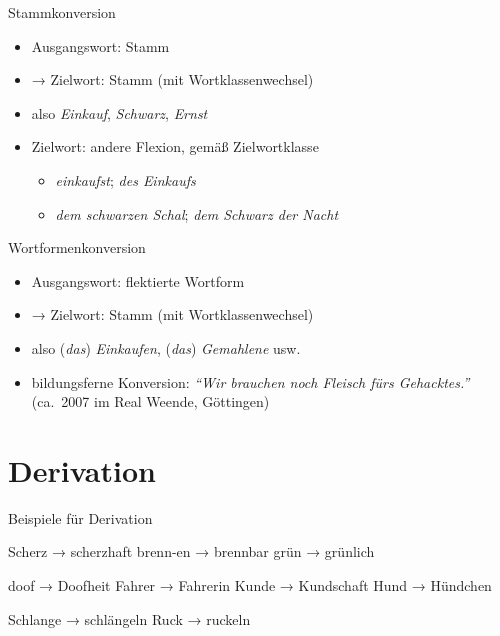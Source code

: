\begin{frame}
  {Stammkonversion}
  \pause
  \begin{itemize}[<+->]
    \item Ausgangswort: Stamm
    \item → Zielwort: Stamm \alert{(mit Wortklassenwechsel)}
      \Halbzeile
    \item also \textit{Einkauf}, \textit{Schwarz}, \textit{Ernst}
      \Halbzeile
    \item Zielwort: andere Flexion, gemäß Zielwortklasse
      \begin{itemize}[<+->]
        \item \textit{einkaufst}; \textit{des Einkaufs}
        \item \textit{dem schwarzen Schal}; \textit{dem Schwarz der Nacht}
      \end{itemize}
  \end{itemize}
\end{frame}

\begin{frame}
  {Wortformenkonversion}
  \pause
  \begin{itemize}[<+->]
    \item Ausgangswort: \alert{flektierte Wortform}
    \item → Zielwort: Stamm \alert{(mit Wortklassenwechsel)}
      \Halbzeile
    \item also (\textit{das}) \textit{Einkaufen}, (\textit{das}) \textit{Gemahlene} usw.
      \Halbzeile
    \item bildungsferne Konversion: \textit{"`Wir brauchen noch Fleisch fürs Gehacktes."'}\\
      (ca.\ 2007 im Real Weende, Göttingen)
  \end{itemize}
\end{frame}

\section{Derivation}

\begin{frame}
  {Beispiele für Derivation}
  \pause
  \begin{exe}
    \ex
    \begin{xlist}
      \ex Scherz → scherzhaft
      \pause
      \ex brenn-en → brennbar
      \pause
      \ex grün → grünlich
    \end{xlist}
    \pause
    \Halbzeile
    \ex
    \begin{xlist}
      \ex doof → Doofheit
      \pause
      \ex Fahrer → Fahrerin
      \pause
      \ex Kunde → Kundschaft
      \pause
      \ex Hund → Hündchen
    \end{xlist}
    \pause
    \Halbzeile
    \ex
    \begin{xlist}
      \ex Schlange → schlängeln
      \pause
      \ex Ruck → ruckeln
    \end{xlist}
  \end{exe}
\end{frame}

